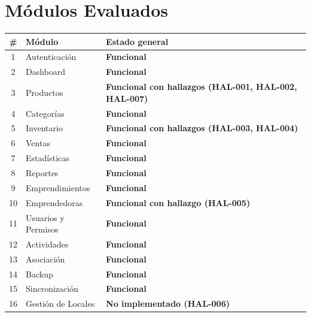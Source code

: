 \section{Módulos Evaluados}

\renewcommand{\arraystretch}{1.65}
\begin{tabularx}{\linewidth}{|c|X|l|}
\hline
\rowcolor{grisheader}
\textbf{\#} & \textbf{Módulo} & \textbf{Estado general} \\
\hline
1  & Autenticación          & \textcolor{verde}{\textbf{Funcional}} \\
\hline
2  & Dashboard              & \textcolor{verde}{\textbf{Funcional}} \\
\hline
3  & Productos              & \textcolor{naranja}{\textbf{Funcional con hallazgos (HAL-001, HAL-002, HAL-007)}} \\
\hline
4  & Categorías             & \textcolor{verde}{\textbf{Funcional}} \\
\hline
5  & Inventario             & \textcolor{naranja}{\textbf{Funcional con hallazgos (HAL-003, HAL-004)}} \\
\hline
6  & Ventas                 & \textcolor{verde}{\textbf{Funcional}} \\
\hline
7  & Estadísticas           & \textcolor{verde}{\textbf{Funcional}} \\
\hline
8  & Reportes               & \textcolor{verde}{\textbf{Funcional}} \\
\hline
9  & Emprendimientos        & \textcolor{verde}{\textbf{Funcional}} \\
\hline
10 & Emprendedoras          & \textcolor{naranja}{\textbf{Funcional con hallazgo (HAL-005)}} \\
\hline
11 & Usuarios y Permisos    & \textcolor{verde}{\textbf{Funcional}} \\
\hline
12 & Actividades            & \textcolor{verde}{\textbf{Funcional}} \\
\hline
13 & Asociación             & \textcolor{verde}{\textbf{Funcional}} \\
\hline
14 & Backup                 & \textcolor{verde}{\textbf{Funcional}} \\
\hline
15 & Sincronización         & \textcolor{verde}{\textbf{Funcional}} \\
\hline
16 & Gestión de Locales     & \textcolor{rojo}{\textbf{No implementado (HAL-006)}} \\
\hline
\end{tabularx}
